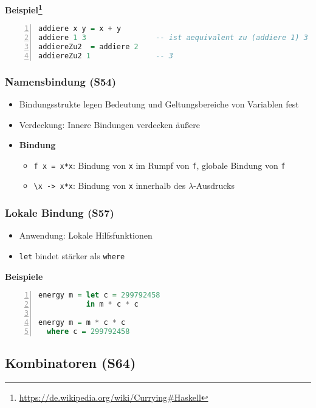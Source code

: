 \textbf{Beispiel\footnote{\url{https://de.wikipedia.org/wiki/Currying\#Haskell}}}

\begin{lstlisting}[frame=single,numbers=left,mathescape,language=Haskell]
addiere x y = x + y
addiere 1 3                -- ist aequivalent zu (addiere 1) 3
addiereZu2  = addiere 2
addiereZu2 1               -- 3
\end{lstlisting}

\subsubsection{Namensbindung (S54)}
\begin{itemize}
	\item Bindungsstrukte legen Bedeutung und Geltungsbereiche von Variablen fest
	\item Verdeckung: Innere Bindungen verdecken äußere
	\item \textbf{Bindung}
	\begin{itemize}
		\item \texttt{f x = x*x}: Bindung von \texttt{x} im Rumpf von \texttt{f}, globale Bindung von \texttt{f}
		\item \texttt{\textbackslash x -> x*x}: Bindung von \texttt{x} innerhalb des \(\lambda\)-Ausdrucks
	\end{itemize}
\end{itemize}

\subsubsection{Lokale Bindung (S57)}
\begin{itemize}
	\item Anwendung: Lokale Hilfsfunktionen
	\item \texttt{let} bindet stärker als \texttt{where}
\end{itemize}

\textbf{Beispiele}

\begin{lstlisting}[frame=single,numbers=left,mathescape,language=Haskell]
energy m = let c = 299792458
           in m * c * c

energy m = m * c * c
  where c = 299792458
\end{lstlisting}

\subsection{Kombinatoren (S64)}

